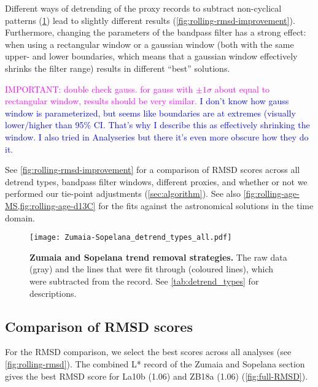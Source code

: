 \documentclass[draft]{agujournal2019}
\newcommand{\rez}{\textcolor{magenta}}
\newcommand{\ijk}{\textcolor{blue}}
\begin{document}
Different ways of detrending of the proxy records to subtract non-cyclical patterns (\cref{fig:detrend}) lead to slightly different results (\cref{fig:rolling-rmsd-improvement}).
Furthermore, changing the parameters of the bandpass filter has a strong effect: when using a rectangular window or a gaussian window (both with the same upper- and lower boundaries, which means that a gaussian window effectively shrinks the filter range) results in different ``best'' solutions.

\rez{IMPORTANT: double check gauss. for gauss with $\pm 1 \sigma$ about equal to rectangular window, results should be very similar.}
\ijk{I don't know how gauss window is parameterized, but seems like boundaries are at extremes (visually lower/higher than 95\% CI. That's why I describe this as effectively shrinking the window. I also tried in Analyseries but there it's even more obscure how they do it.}

See \cref{fig:rolling-rmsd-improvement} for a comparison of \gls{RMSD} scores across all detrend types, bandpass filter windows, different proxies, and whether or not we performed our tie-point adjustments (\cref{sec:algorithm}).
See also \cref{fig:rolling-age-MS,fig:rolling-age-d13C} for the fits against the astronomical solutions in the time domain.

\begin{figure}[htbp]
  \centering
  \texttt{[image: Zumaia-Sopelana\_detrend\_types\_all.pdf]}
  \caption{\label{fig:detrend}
    \textbf{Zumaia and Sopelana trend removal strategies.}
    The raw data (gray) and the lines that were fit through (coloured lines), which were subtracted from the record. See \cref{tab:detrend_types} for descriptions.
  }
\end{figure}

\subsection{Comparison of RMSD scores}

For the RMSD comparison, we select the best scores across all analyses (see \cref{fig:rolling-rmsd}).
The combined \gls{L*} record of the Zumaia and Sopelana section gives the best \gls{RMSD} score for La10b (\num{1.06}) and ZB18a (\num{1.06}) (\cref{fig:full-RMSD}).
\end{document}
